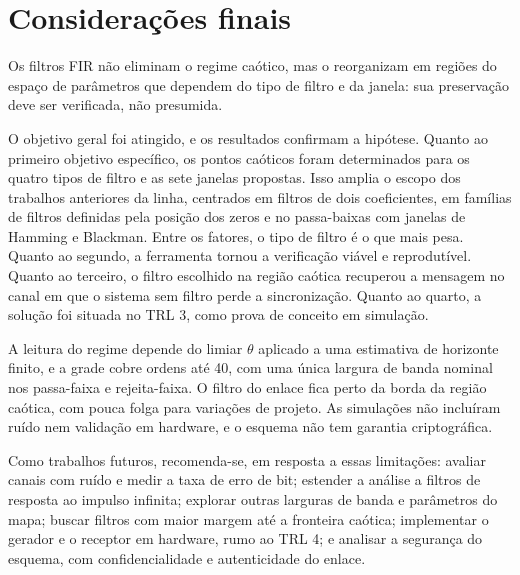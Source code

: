 \documentclass{pfccefsa}
\begin{document}
\section{Considerações finais}
\label{sec:conclusao}

Os filtros FIR não eliminam o regime caótico, mas o reorganizam em regiões do
espaço de parâmetros que dependem do tipo de filtro e da janela: sua preservação
deve ser verificada, não presumida.

O objetivo geral foi atingido, e os resultados confirmam a hipótese. Quanto ao
primeiro objetivo específico, os pontos caóticos foram determinados para os
quatro tipos de filtro e as sete janelas propostas. Isso amplia o escopo dos
trabalhos anteriores da linha, centrados em filtros de dois coeficientes, em
famílias de filtros definidas pela posição dos zeros e no passa-baixas com
janelas de Hamming e Blackman. Entre os fatores, o tipo de filtro é o que mais
pesa. Quanto ao segundo, a
ferramenta tornou a verificação viável e reprodutível. Quanto ao terceiro, o
filtro escolhido na região caótica recuperou a mensagem no canal em que o sistema
sem filtro perde a sincronização. Quanto ao quarto, a solução foi situada no
TRL 3, como prova de conceito em simulação.

A leitura do regime depende do limiar $\theta$ aplicado a uma estimativa de
horizonte finito, e a grade cobre ordens até 40, com uma única largura de banda
nominal nos passa-faixa e rejeita-faixa. O filtro do
enlace fica perto da borda da região caótica, com pouca folga para variações de
projeto. As simulações não
incluíram ruído nem validação em hardware, e o esquema não tem garantia
criptográfica.

Como trabalhos futuros, recomenda-se, em resposta a essas limitações: avaliar
canais com ruído e medir a taxa de erro de bit; estender a análise a filtros de resposta ao impulso
infinita; explorar outras larguras de banda e parâmetros do mapa; buscar filtros
com maior margem até a fronteira caótica; implementar o gerador e o receptor em
hardware, rumo ao TRL 4; e analisar a segurança do esquema, com confidencialidade
e autenticidade do enlace.

\imprimirreferencias
\end{document}
